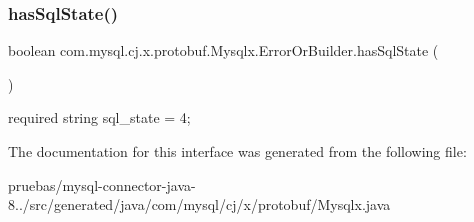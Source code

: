 \subsubsection{\texorpdfstring{has\+Sql\+State()}{hasSqlState()}}
{\footnotesize\ttfamily boolean com.\+mysql.\+cj.\+x.\+protobuf.\+Mysqlx.\+Error\+Or\+Builder.\+has\+Sql\+State (\begin{DoxyParamCaption}{ }\end{DoxyParamCaption})}

{\ttfamily required string sql\+\_\+state = 4;} 

The documentation for this interface was generated from the following file\+:\begin{DoxyCompactItemize}
\item 
pruebas/mysql-\/connector-\/java-\/8../src/generated/java/com/mysql/cj/x/protobuf/Mysqlx.\+java\end{DoxyCompactItemize}
